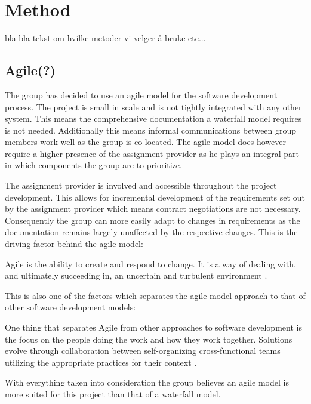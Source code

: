 \section{Method}
bla bla tekst om hvilke metoder vi velger å bruke etc...

\subsection{Agile(?)}
The group has decided to use an agile model for the software development process.
The project is small in scale and is not tightly integrated with any other system.
This means the comprehensive documentation a waterfall model requires is not needed.
Additionally this means informal communications between group members work well as the group is co-located.
The agile model does however require a higher presence of the assignment provider as he plays an integral part in which components the group are to prioritize.

The assignment provider is involved and accessible throughout the project development.
This allows for incremental development of the requirements set out by the assignment provider which means contract negotiations are not necessary.
Consequently the group can more easily adapt to changes in requirements as the documentation remains largely unaffected by the respective changes.
This is the driving factor behind the agile model:
\begin{displayquote}
Agile is the ability to create and respond to change.
It is a way of dealing with, and ultimately succeeding in, an uncertain and turbulent environment \cite{what-is-agile}.
\end{displayquote}
This is also one of the factors which separates the agile model approach to that of other software development models:

\begin{displayquote}
One thing that separates Agile from other approaches to software development is the focus on the people doing the work and how they work together.
Solutions evolve through collaboration between self-organizing cross-functional teams utilizing the appropriate practices for their context \cite{what-is-agile-software-development}.
\end{displayquote}
With everything taken into consideration the group believes an agile model is more suited for this project than that of a waterfall model.

